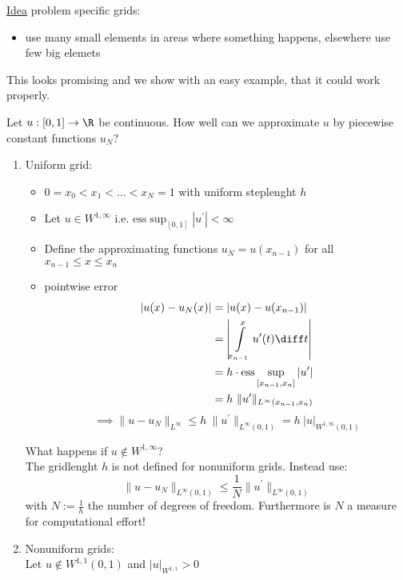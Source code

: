 \underline{Idea} problem specific grids:
\begin{itemize}
	\item use many small elements in areas where something \glqq happens\grqq, elsewhere use few big elemets
\end{itemize}
This looks promising and we show with an easy example, that it could work properly.
\begin{example}
	Let $u: [0,1] \to \R $ be continuous. How well can we approximate $u$ by piecewise constant functions $u_{N}$?
	\begin{enumerate}[label = \Roman*)]
		\item Uniform grid:
			\begin{itemize}
				\item $0 = x_{0} < x_{1}< \dots < x_{N} = 1$ with uniform steplenght $h$
				\item Let $u \in W^{1,\infty}$ i.e. $\text{ess}\sup_{[0,1]} | u^\prime|< \infty$
				\item Define the approximating functions $u_{N}=u(x_{n-1})$ for all $x_{n-1}\leq x \leq x_{n}$
				\item pointwise error
					\begin{align*}
						|u(x) - u_{N}(x) | &= | u(x) - u(x_{n-1})|\\
										   &= \left| \int\limits_{x_{n-1}}^{x} u^\prime(t) \diff t \right|\\
										   &= h\cdot \text{ess}\sup_{[x_{n-1},x_{n}]}|u^\prime | \\
										   &= h\ \|u^\prime\|_{L^\infty(x_{n-1},x_{n})}
					\end{align*}
					\begin{equation*}
						\implies\|u -u_{N}\|_{L^\infty} \leq h \ \|u^\prime\|_{L^\infty(0,1)}= h \ |u|_{W^{1,\infty}(0,1)}
				\end{equation*}
			\end{itemize}
			What happens if $u \not \in W^{1,\infty}$?\\
			The gridlenght $h$ is not defined for nonuniform grids. Instead use:
			\begin{equation*}
				\|u-u_{N}\|_{L^{\infty}(0,1)}  \leq \frac{1}{N} \|u^\prime\|_{L^\infty(0,1)}
			\end{equation*}
			with $N := \frac{1}{h}$ the number of degrees of freedom. Furthermore is $N$ a measure for computational effort!
		\item Nonuniform grids:\\
			Let $u \not \in W^{1,1}(0,1)$ and $|u|_{W^{1,1}}>0$

\end{enumerate}
\end{example}
